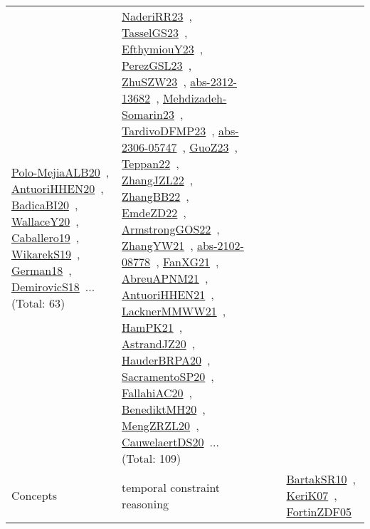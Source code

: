 {\begin{longtable}{lp{3cm}>{\raggedright\arraybackslash}p{6cm}>{\raggedright\arraybackslash}p{6cm}>{\raggedright\arraybackslash}p{8cm}}
\href{works/Polo-MejiaALB20.pdf}{Polo-MejiaALB20}~\cite{Polo-MejiaALB20}, \href{works/AntuoriHHEN20.pdf}{AntuoriHHEN20}~\cite{AntuoriHHEN20}, \href{works/BadicaBI20.pdf}{BadicaBI20}~\cite{BadicaBI20}, \href{works/WallaceY20.pdf}{WallaceY20}~\cite{WallaceY20}, \href{works/Caballero19.pdf}{Caballero19}~\cite{Caballero19}, \href{works/WikarekS19.pdf}{WikarekS19}~\cite{WikarekS19}, \href{works/German18.pdf}{German18}~\cite{German18}, \href{works/DemirovicS18.pdf}{DemirovicS18}~\cite{DemirovicS18}... (Total: 63) & \href{works/NaderiRR23.pdf}{NaderiRR23}~\cite{NaderiRR23}, \href{works/TasselGS23.pdf}{TasselGS23}~\cite{TasselGS23}, \href{works/EfthymiouY23.pdf}{EfthymiouY23}~\cite{EfthymiouY23}, \href{works/PerezGSL23.pdf}{PerezGSL23}~\cite{PerezGSL23}, \href{works/ZhuSZW23.pdf}{ZhuSZW23}~\cite{ZhuSZW23}, \href{works/abs-2312-13682.pdf}{abs-2312-13682}~\cite{abs-2312-13682}, \href{works/Mehdizadeh-Somarin23.pdf}{Mehdizadeh-Somarin23}~\cite{Mehdizadeh-Somarin23}, \href{works/TardivoDFMP23.pdf}{TardivoDFMP23}~\cite{TardivoDFMP23}, \href{works/abs-2306-05747.pdf}{abs-2306-05747}~\cite{abs-2306-05747}, \href{works/GuoZ23.pdf}{GuoZ23}~\cite{GuoZ23}, \href{works/Teppan22.pdf}{Teppan22}~\cite{Teppan22}, \href{works/ZhangJZL22.pdf}{ZhangJZL22}~\cite{ZhangJZL22}, \href{works/ZhangBB22.pdf}{ZhangBB22}~\cite{ZhangBB22}, \href{works/EmdeZD22.pdf}{EmdeZD22}~\cite{EmdeZD22}, \href{works/ArmstrongGOS22.pdf}{ArmstrongGOS22}~\cite{ArmstrongGOS22}, \href{works/ZhangYW21.pdf}{ZhangYW21}~\cite{ZhangYW21}, \href{works/abs-2102-08778.pdf}{abs-2102-08778}~\cite{abs-2102-08778}, \href{works/FanXG21.pdf}{FanXG21}~\cite{FanXG21}, \href{works/AbreuAPNM21.pdf}{AbreuAPNM21}~\cite{AbreuAPNM21}, \href{works/AntuoriHHEN21.pdf}{AntuoriHHEN21}~\cite{AntuoriHHEN21}, \href{works/LacknerMMWW21.pdf}{LacknerMMWW21}~\cite{LacknerMMWW21}, \href{works/HamPK21.pdf}{HamPK21}~\cite{HamPK21}, \href{works/AstrandJZ20.pdf}{AstrandJZ20}~\cite{AstrandJZ20}, \href{works/HauderBRPA20.pdf}{HauderBRPA20}~\cite{HauderBRPA20}, \href{works/SacramentoSP20.pdf}{SacramentoSP20}~\cite{SacramentoSP20}, \href{works/FallahiAC20.pdf}{FallahiAC20}~\cite{FallahiAC20}, \href{works/BenediktMH20.pdf}{BenediktMH20}~\cite{BenediktMH20}, \href{works/MengZRZL20.pdf}{MengZRZL20}~\cite{MengZRZL20}, \href{works/CauwelaertDS20.pdf}{CauwelaertDS20}~\cite{CauwelaertDS20}... (Total: 109)\\
Concepts & temporal constraint reasoning &  &  & \href{works/BartakSR10.pdf}{BartakSR10}~\cite{BartakSR10}, \href{works/KeriK07.pdf}{KeriK07}~\cite{KeriK07}, \href{works/FortinZDF05.pdf}{FortinZDF05}~\cite{FortinZDF05}\\

\end{longtable}}
